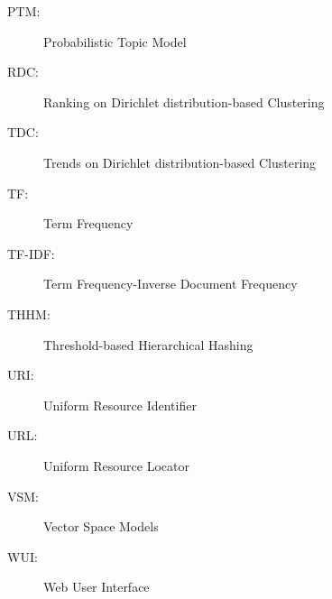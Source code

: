 \begin{description}
	\item[PTM:] Probabilistic Topic Model
	\item[RDC:] Ranking on Dirichlet distribution-based Clustering
	\item[TDC:] Trends on Dirichlet distribution-based Clustering
	\item[TF:] Term Frequency
	\item[TF-IDF:] Term Frequency-Inverse Document Frequency
	\item[THHM:] Threshold-based Hierarchical Hashing
	\item[URI:] Uniform Resource Identifier
	\item[URL:] Uniform Resource Locator
	\item[VSM:] Vector Space Models
	\item[WUI:] Web User Interface
\end{description}









